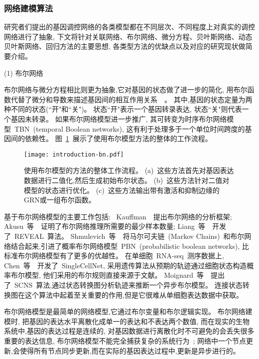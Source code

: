 \subsubsection{网络建模算法}
研究者们提出的基因调控网络的各类模型都在不同层次、不同程度上对真实的调控网络进行了抽象,
下文将针对关联网络、布尔网络、微分方程、贝叶斯网络、动态贝叶斯网络、回归方法的主要思想,
各类型方法的优缺点以及对应的研究现状做简要介绍。

(1) 布尔网络

布尔网络与微分方程相比则更为抽象,它对基因的状态做了进一步的简化,
用布尔函数代替了微分和导数来描述基因间的相互作用关系~\cite{shmulevich2002probabilistic,kim2007boolean,bornholdt2008boolean,zhou2016relative}~。
其中,基因的状态定量为两种不同的状态(``开"和``关")。
状态``开"表示一个基因转录表达, 状态``关"则代表一个基因未转录。
如果布尔网络模型进一步推广, 其可转变为时序布尔网络模型~TBN~(temporal Boolean networks), 这有利于处理多于一个单位时间跨度的基因间的依赖性。
图~\ref{fig:pre-bn}~展示了使用布尔模型方法的整体的工作流程。
\begin{figure}[!htbp]
    \centering
    \texttt{[image: introduction-bn.pdf]}
    \caption{
        使用布尔模型的方法的整体工作流程。
        (a)~这些方法首先对基因表达数据进行二值化,然后生成初始布尔状态。
        (b)~这些方法针对二值对模型的状态进行优化。
        (c)~这些方法输出带有激活和抑制边缘的GRN或一组布尔函数。
    }
    \label{fig:pre-bn}
\end{figure}

基于布尔网络模型的主要工作包括:
~Kauffman~\cite{kauffman2003random}~提出布尔网络的分析框架;
Akusu~等~\cite{akutsu1999identification}~证明了布尔网络推理所需要的最少样本数量;
Liang~等~\cite{liang1998reveal}~开发了~REVEAL~算法。
Shmulevich~等~\cite{marshall2007inference}~将马尔可夫链~(Markov Chains)~和布尔网络结合起来,引进了概率布尔网络模型~PBN~(probabilistic boolean networks),
比标准布尔网络模型有了更多的优越性。
在单细胞~RNA-seq~测序数据上,
Chen~等~\cite{chen2014single}~开发了~SingleCellNet,
采用遗传算法从预期的轨迹通过细胞状态构造概率布尔模型, 他们采用的布尔规则直接来源于文献。
Moignard~等~\cite{moignard2015decoding}~提出了~SCNS~算法,通过状态转换图分析轨迹来推断一个异步布尔模型。
连接状态转换图在这个算法中起着至关重要的作用,但是它很难从单细胞表达数据中获取。

布尔网络模型是最简单的网络模型,它通过布尔变量和布尔逻辑实现。
布尔网络建模时, 把基因的表达水平离散化成单一的表达和不表达两个数值,
而在现实的生物系统中,基因的表达过程是连续的,
对基因数据进行离散化时不可避免的会丢失很多重要的表达信息,
布尔网络模型不能完全捕获复杂的系统行为~\cite{lee2009computational};
网络中一个节点更新,会使得所有节点同步更新,而在实际的基因表达过程中,更新是异步进行的。

